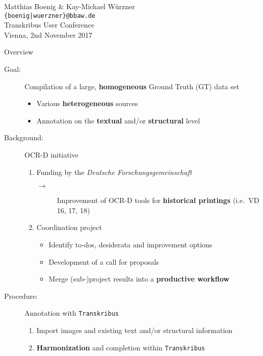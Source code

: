 \documentclass{bbawslides}
\begin{document}
\providecommand{\Title}{}


\begin{bbawtitle}
  \vspace*{0.5em}%
  Matthias Boenig \& Kay-Michael Würzner\\[-.25em]%
  \textcolor{urlColor}{\texttt{{\small \{boenig|wuerzner\}@bbaw.de}}}
  \\[1.5em]
  {\scriptsize{%
    Transkribus User Conference\\%
    Vienna, 2nd November 2017\\%
  }}
\end{bbawtitle}
\slideStyleFrame

\renewcommand{\footerText}{\tiny 2nd November 2017, Transkribus User Conference}

\begin{bbawslide}{Overview}
  \vspace*{7mm}%
  \centerslidestrue%
  \begin{description}
    \item[Goal:] Compilation of a large, \textbf{homogeneous} Ground Truth (GT) data set
    \begin{itemize}\small
      \item Various \textbf{heterogeneous} sources
      \item Annotation on the \textbf{textual} and/or \textbf{structural} level
    \end{itemize}
    \item[Background:] OCR-D initiative
    \begin{enumerate}[label=\alph*.]\small
      \item Funding by the \emph{Deutsche Forschungsgemeinschaft}
      \begin{description}
        \item[$\rightarrow$] Improvement of OCR-D tools for \textbf{historical printings} (i.e.~VD 16, 17, 18)
      \end{description}
      \item Coordination project
      \begin{itemize}
        \item Identify to-dos, desiderata and improvement options
        \item Development of a call for proposals
        \item Merge (sub-)project results into a \textbf{productive workflow}
      \end{itemize}
    \end{enumerate}
    \item[Procedure:] Annotation with \texttt{Transkribus}
    \begin{enumerate}\small
      \item Import images and existing text and/or structural information
      \item \textbf{Harmonization} and completion within \texttt{Transkribus}
    \end{enumerate}
  \end{description}
\end{bbawslide}
\end{document}
